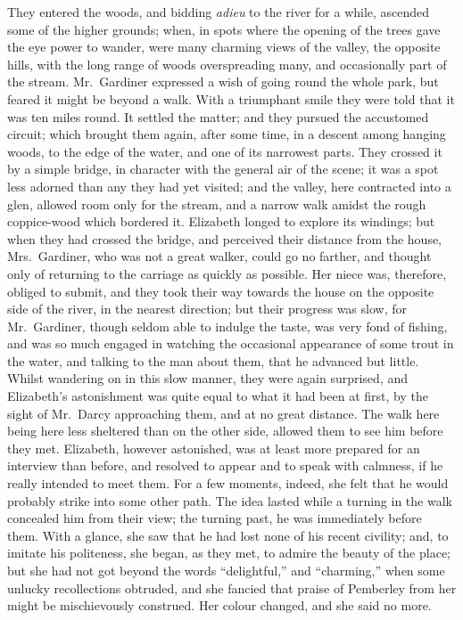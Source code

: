 \documentclass[12pt,english]{book}
\begin{document}
They entered the woods, and bidding \emph{adieu} to the river for
a while, ascended some of the higher grounds; when, in spots where
the opening of the trees gave the eye power to wander, were many charming
views of the valley, the opposite hills, with the long range of woods
overspreading many, and occasionally part of the stream. Mr.\ Gardiner
expressed a wish of going round the whole park, but feared it might
be beyond a walk. With a triumphant smile they were told that it was
ten miles round. It settled the matter; and they pursued the accustomed
circuit; which brought them again, after some time, in a descent among
hanging woods, to the edge of the water, and one of its narrowest
parts. They crossed it by a simple bridge, in character with the general
air of the scene; it was a spot less adorned than any they had yet
visited; and the valley, here contracted into a glen, allowed room
only for the stream, and a narrow walk amidst the rough coppice-wood
which bordered it. Elizabeth longed to explore its windings; but when
they had crossed the bridge, and perceived their distance from the
house, Mrs.\ Gardiner, who was not a great walker, could go no farther,
and thought only of returning to the carriage as quickly as possible.
Her niece was, therefore, obliged to submit, and they took their way
towards the house on the opposite side of the river, in the nearest
direction; but their progress was slow, for Mr.\ Gardiner, though
seldom able to indulge the taste, was very fond of fishing, and was
so much engaged in watching the occasional appearance of some trout
in the water, and talking to the man about them, that he advanced
but little. Whilst wandering on in this slow manner, they were again
surprised, and Elizabeth's astonishment was quite equal to what it
had been at first, by the sight of Mr.\ Darcy approaching them, and
at no great distance. The walk here being here less sheltered than
on the other side, allowed them to see him before they met. Elizabeth,
however astonished, was at least more prepared for an interview than
before, and resolved to appear and to speak with calmness, if he really
intended to meet them. For a few moments, indeed, she felt that he
would probably strike into some other path. The idea lasted while
a turning in the walk concealed him from their view; the turning past,
he was immediately before them. With a glance, she saw that he had
lost none of his recent civility; and, to imitate his politeness,
she began, as they met, to admire the beauty of the place; but she
had not got beyond the words {}``delightful,'' and {}``charming,''
when some unlucky recollections obtruded, and she fancied that praise
of Pemberley from her might be mischievously construed. Her colour
changed, and she said no more.
\end{document}
